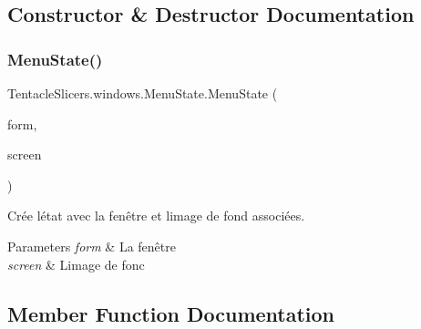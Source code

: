 \subsection{Constructor \& Destructor Documentation}
\mbox{\label{class_tentacle_slicers_1_1windows_1_1_menu_state_abddb0d07d620c477680721407fdaa454}} 
\subsubsection{\texorpdfstring{Menu\+State()}{MenuState()}}
{\footnotesize\ttfamily Tentacle\+Slicers.\+windows.\+Menu\+State.\+Menu\+State (\begin{DoxyParamCaption}\item[{\hyperlink{class_tentacle_slicers_1_1windows_1_1_main_form}{Main\+Form}}]{form,  }\item[{\hyperlink{class_tentacle_slicers_1_1graphics_1_1_basic_sprite}{Basic\+Sprite}}]{screen }\end{DoxyParamCaption})\hspace{0.3cm}{\ttfamily [protected]}}



Crée l\textquotesingle{}état avec la fenêtre et l\textquotesingle{}image de fond associées. 


\begin{DoxyParams}{Parameters}
{\em form} & La fenêtre \\
\hline
{\em screen} & L\textquotesingle{}image de fonc \\
\hline
\end{DoxyParams}


\subsection{Member Function Documentation}
\mbox{\label{class_tentacle_slicers_1_1windows_1_1_menu_state_adad16f85474aa05c42a263125e862f10}} 
